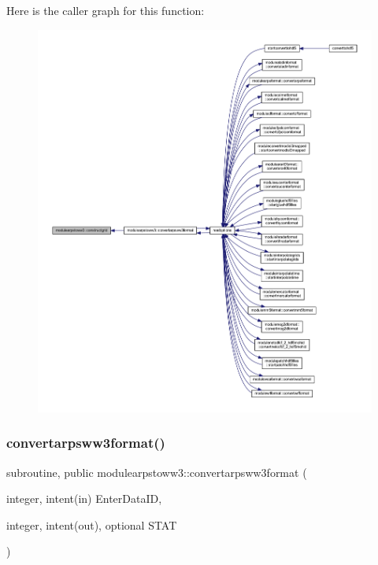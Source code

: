 Here is the caller graph for this function\+:\nopagebreak
\begin{figure}[H]
\begin{center}
\leavevmode
\includegraphics[width=350pt]{namespacemodulearpstoww3_a509b1aea6540dc5784cfe7424f0e6414_icgraph}
\end{center}
\end{figure}
\mbox{\label{namespacemodulearpstoww3_a42304b111881f48406d8d939918e21ef}} 
\subsubsection{\texorpdfstring{convertarpsww3format()}{convertarpsww3format()}}
{\footnotesize\ttfamily subroutine, public modulearpstoww3\+::convertarpsww3format (\begin{DoxyParamCaption}\item[{integer, intent(in)}]{Enter\+Data\+ID,  }\item[{integer, intent(out), optional}]{S\+T\+AT }\end{DoxyParamCaption})}

